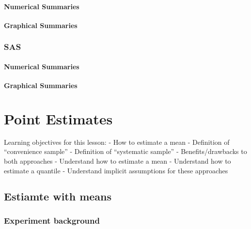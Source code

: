 \documentclass[
]{book}
\theoremstyle{definition}
\theoremstyle{definition}
\theoremstyle{definition}
\theoremstyle{remark}
\begin{document}
\hypertarget{numerical-summaries}{%
\subsubsection{Numerical Summaries}\label{numerical-summaries}}

\hypertarget{graphical-summaries}{%
\subsubsection{Graphical Summaries}\label{graphical-summaries}}

\hypertarget{sas-1}{%
\subsection{SAS}\label{sas-1}}

\hypertarget{numerical-summaries-1}{%
\subsubsection{Numerical Summaries}\label{numerical-summaries-1}}

\hypertarget{graphical-summaries-1}{%
\subsubsection{Graphical Summaries}\label{graphical-summaries-1}}

\hypertarget{point-estimates}{%
\chapter{Point Estimates}\label{point-estimates}}

Learning objectives for this lesson:
- How to estimate a mean
- Definition of ``convenience sample''
- Definition of ``systematic sample''
- Benefits/drawbacks to both approaches
- Understand how to estimate a mean
- Understand how to estimate a quantile
- Understand implicit assumptions for these approaches

\hypertarget{estiamte-with-means}{%
\section{Estiamte with means}\label{estiamte-with-means}}

\hypertarget{experiment-background}{%
\subsection{Experiment background}\label{experiment-background}}
\end{document}
